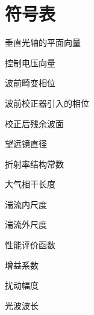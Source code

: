 \chapter*{符号表}
\begin{description}[itemindent=3cm,labelwidth=3cm]
  \item[$\bm{r}$]  垂直光轴的平面向量
  \item[$\bm{u}$]  控制电压向量
  \item[$\phi(\bm{r}),\phi(x,y)$]  波前畸变相位
  \item[$m(\bm{r}),m(x,y)$] 波前校正器引入的相位
  \item[$\mu(\bm{r}),\mu(x,y)$] 校正后残余波面
  \item[$D$] 望远镜直径
  \item[$C_n^2$] 折射率结构常数
  \item[$r_0$] 大气相干长度
  \item[$l_0$] 湍流内尺度
  \item[$L_0$] 湍流外尺度
  \item[$J$] 性能评价函数
  \item[$\gamma$] 增益系数
  \item[$\delta$] 扰动幅度
  \item[$\lambda$] 光波波长
\end{description}


